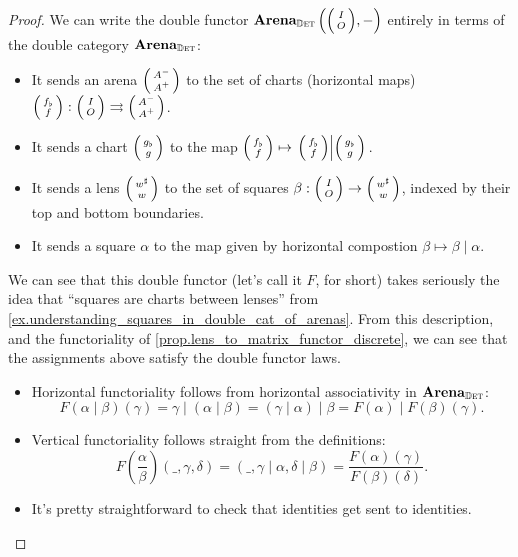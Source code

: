 \documentclass[DynamicalBook]{subfiles}
\begin{document}
\begin{proof}
 

We can write the double functor $\Cat{Arena}_{\determ}\left(\littlelens{I}{O}, - \right)$
entirely in terms of the double category $\textbf{Arena}_{\mathbb{D}\textsc{et}}$:
\begin{itemize}
  \item It sends an arena $\lens{A^-}{A^+}$ to the set of charts (horizontal
    maps) $\lens{f_{\flat}}{f} : \lens{I}{O}  \tto \lens{A^-}{A^+}$.
  \item It sends a chart $\lens{g_{\flat}}{g}$ to the map $\lens{f_{\flat}}{f}
    \mapsto \left. \lens{f_{\flat}}{f} \middle| \lens{g_{\flat}}{g} \right.$.
  \item It sends a lens $\lens{w^{\sharp}}{w}$ to the set of squares $\beta :
    \lens{I}{O} \to \lens{w^{\sharp}}{w}$, indexed by their top and bottom
    boundaries.
  \item It sends a square $\alpha$ to the map given by horizontal compostion
    $\beta \mapsto \beta \mid \alpha$.
\end{itemize}

We can see that this double functor (let's call it $F$, for short) takes seriously the idea that ``squares are
charts between lenses'' from
\cref{ex.understanding_squares_in_double_cat_of_arenas}. From this description,
and the functoriality of \cref{prop.lens_to_matrix_functor_discrete}, we can see
that the assignments above satisfy the double functor laws. 
\begin{itemize}
  \item Horizontal functoriality follows from horizontal associativity in
    $\textbf{Arena}_{\mathbb{D}\textsc{et}}$:
$$F(\alpha\mid \beta)(\gamma) = \gamma \mid (\alpha \mid \beta) = (\gamma \mid
\alpha) \mid \beta = F(\alpha) \mid F(\beta) (\gamma).$$
\item Vertical functoriality follows straight from the definitions:
  $$F\left( \frac{\alpha}{\beta} \right)(\_, \gamma, \delta) = (\_, \gamma \mid
  \alpha, \delta \mid \beta) = \frac{F(\alpha)(\gamma)}{F(\beta)(\delta)}.$$
\item It's pretty straightforward to check that identities get sent to identities.
\end{itemize}
\end{proof}
\end{document}
